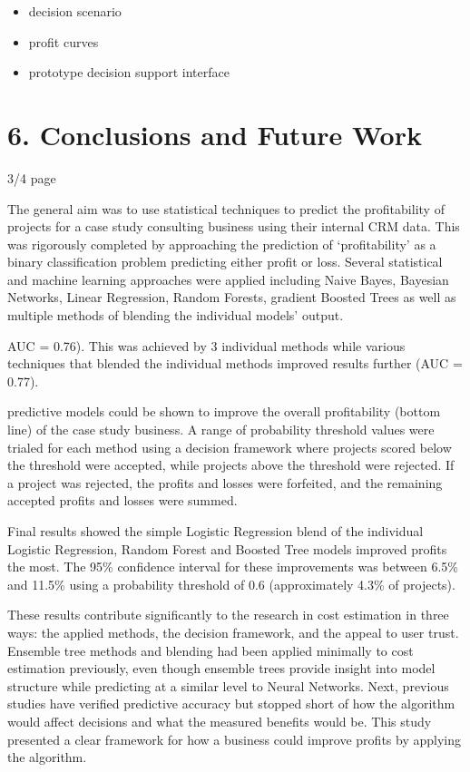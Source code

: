 \documentclass[]{elsarticle} %
\begin{document}
\begin{itemize}
\item
  decision scenario
\item
  profit curves
\item
  prototype decision support interface
\end{itemize}

\section{6. Conclusions and Future
Work}\label{conclusions-and-future-work}

3/4 page

The general aim was to use statistical techniques to predict the
profitability of projects for a case study consulting business using
their internal CRM data. This was rigorously completed by approaching
the prediction of `profitability' as a binary classification problem
predicting either profit or loss. Several statistical and machine
learning approaches were applied including Naive Bayes, Bayesian
Networks, Linear Regression, Random Forests, gradient Boosted Trees as
well as multiple methods of blending the individual models' output.

AUC = 0.76). This was achieved by 3 individual methods while various
techniques that blended the individual methods improved results further
(AUC = 0.77).

predictive models could be shown to improve the overall profitability
(bottom line) of the case study business. A range of probability
threshold values were trialed for each method using a decision framework
where projects scored below the threshold were accepted, while projects
above the threshold were rejected. If a project was rejected, the
profits and losses were forfeited, and the remaining accepted profits
and losses were summed.

Final results showed the simple Logistic Regression blend of the
individual Logistic Regression, Random Forest and Boosted Tree models
improved profits the most. The 95\% confidence interval for these
improvements was between 6.5\% and 11.5\% using a probability threshold
of 0.6 (approximately 4.3\% of projects).

These results contribute significantly to the research in cost
estimation in three ways: the applied methods, the decision framework,
and the appeal to user trust. Ensemble tree methods and blending had
been applied minimally to cost estimation previously, even though
ensemble trees provide insight into model structure while predicting at
a similar level to Neural Networks. Next, previous studies have verified
predictive accuracy but stopped short of how the algorithm would affect
decisions and what the measured benefits would be. This study presented
a clear framework for how a business could improve profits by applying
the algorithm.
\end{document}
